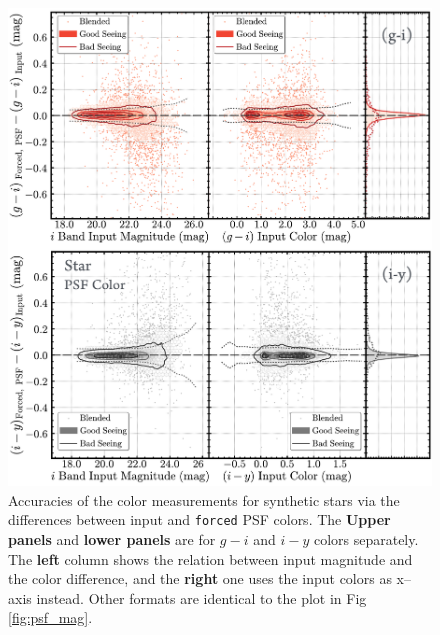 \documentclass[useamsfonts]{pasj01}
\def\forced{\texttt{forced}}
\begin{document}
\begin{figure}
    \begin{center}
        \includegraphics[width=\textwidth]{fig/synpipe_psf_color}
    \end{center}
    \caption{
        Accuracies of the color measurements for synthetic stars via the differences
        between input and \forced{} PSF colors. 
        The \textbf{Upper panels} and \textbf{lower panels} are for $g-i$ and $i-y$ 
        colors separately.
        The \textbf{left} column shows the relation between input magnitude and 
        the color difference, and the \textbf{right} one uses the input colors as
        x--axis instead. 
        Other formats are identical to the plot in Fig \ref{fig:psf_mag}.
        }
    \label{fig:psf_color}
\end{figure}
\end{document}

